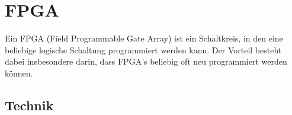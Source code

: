 \chapter{FPGA} %
\label{FPGA} %

Ein FPGA (Field Programmable Gate Array) ist ein Schaltkreis, in den eine beliebige logische Schaltung programmiert werden kann. Der Vorteil besteht dabei insbesondere darin, dass FPGA's beliebig oft neu programmiert werden können. 

\section{Technik}

